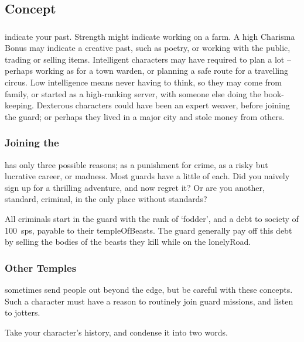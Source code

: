 \begin{multicols}{2}
\columnbreak

\subsection{Concept}

\subsubsection{}
indicate your past.
Strength might indicate working on a farm.
A high Charisma Bonus may indicate a creative past, such as poetry, or working with the public, trading or selling items.
Intelligent characters may have required to plan a lot -- perhaps working as  for a town \gls{warden}, or planning a safe route for a travelling circus.
Low intelligence means never having to think, so they may come from  family, or started as a high-ranking \gls{server}, with someone else doing the book-keeping.
Dexterous characters could have been an expert weaver, before joining the \gls{guard}; or perhaps they lived in a major city and stole money from others.

\subsubsection{Joining the }
has only three possible reasons; as a punishment for crime, as a risky but lucrative career, or madness.
Most \glspl{guard} have a little of each.
Did you naively sign up for a thrilling adventure, and now regret it?
Or are you another, standard, criminal, in the only place without standards?

All criminals start in the \gls{guard} with the rank of `\gls{fodder}', and a debt to society of 100~\glspl{sp}, payable to their \gls{templeOfBeasts}.
The \gls{guard} generally pay off this debt by selling the bodies of the beasts they kill while on the \gls{lonelyRoad}.

\subsubsection{Other Temples}
sometimes send people out beyond the \gls{edge}, but be careful with these concepts.
Such a character must have a reason to routinely join \gls{guard} missions, and listen to \glspl{jotter}.

Take your character's history, and condense it into two words.


\end{multicols}
